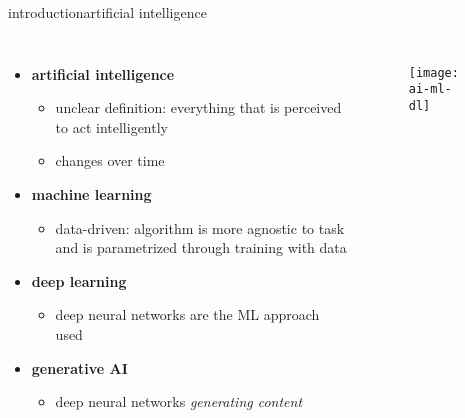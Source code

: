 \begin{frame}{introduction}{artificial intelligence}
    \vspace{-5mm}
    \begin{columns}
        \begin{itemize}
            \item \textbf{artificial intelligence}
                \begin{itemize}
                    \item   unclear definition: everything that is perceived to act intelligently
                    \item   changes over time
                \end{itemize}
            \bigskip
            \item \textbf{machine learning}
                \begin{itemize}
                    \item   data-driven: algorithm is more agnostic to task and is parametrized through training with data
                \end{itemize}
            \bigskip
            \item   \textbf{deep learning}
                \begin{itemize}
                    \item deep neural networks are the ML approach used
                \end{itemize}
            \bigskip
            \item   \textbf{generative AI}
                \begin{itemize}
                    \item deep neural networks \textit{generating content}
                \end{itemize}
        \end{itemize}
        \begin{figure}%
            \texttt{[image: ai-ml-dl]}%
        \end{figure}
    \end{columns}
\end{frame}

